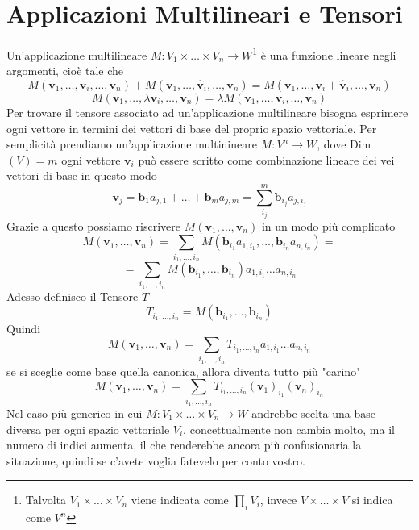 \documentclass[11pt,a4paper]{report}
\newcommand{\vettore}[1]{\mathbf{#1}}
\theoremstyle{definition}
\theoremstyle{plain}
\theoremstyle{plain}
\begin{document}
		\section{Applicazioni Multilineari e Tensori}
			Un'applicazione multilineare $M:V_1\times\dots\times V_n\rightarrow W$\footnote{Talvolta $V_1\times\dots\times V_n$ viene indicata come $\prod_i V_i$, invece $V\times\dots\times V$ si indica come $V^n$} è una funzione lineare negli argomenti, cioè tale che
			\[
				M(\vettore v_1,\dots,\vettore v_i,\dots,\vettore v_n)+M(\vettore v_1,\dots,\vettore{\hat v}_i,\dots,\vettore v_n)=
				M(\vettore v_1,\dots,\vettore v_i+\vettore{\hat v}_i,\dots,\vettore v_n)
			\]
			\begin{equation}
				M(\vettore v_1,\dots,\lambda \vettore v_i,\dots,\vettore v_n)=
				\lambda M(\vettore v_1,\dots,\vettore v_i,\dots,\vettore v_n)
			\end{equation}
			Per trovare il tensore associato ad un'applicazione multilineare bisogna esprimere ogni vettore in termini dei vettori di base del proprio spazio vettoriale.\newline
			Per semplicità prendiamo un'applicazione multinineare $M:V^n\rightarrow W$, dove Dim$(V)=m$\newline
			ogni vettore $\vettore v_i$ può essere scritto come combinazione lineare dei vei vettori di base in questo modo 
			\[
				\vettore v_j=\vettore b_1 a_{j,1}+\dots +\vettore b_m a_{j,m}=\sum_{i_j}^m\vettore b_{i_j}a_{j,i_j}
			\]
			Grazie a questo possiamo riscrivere $M(\vettore v_1,\dots,\vettore v_n)$ in un modo più complicato\newline
			\[
				M(\vettore v_1,\dots,\vettore v_n)=
				\sum_{i_1,\dots,i_n}M(\vettore b_{i_1}  a_{1,{i_1}},\dots,\vettore b_{i_n} a_{n,{i_n}})=
			\]
			\[
				=\sum_{i_1,\dots,i_n}M(\vettore b_{i_1},\dots,\vettore b_{i_n})a_{1,{i_1}}\dots a_{n,{i_n}}
			\]
			Adesso definisco il Tensore $T$
			\begin{equation}
				T_{i_1,\dots,i_n}=M(\vettore b_{i_1},\dots,\vettore b_{i_n})
			\end{equation}
			Quindi
			\begin{equation}
				M(\vettore v_1,\dots,\vettore v_n)=\sum_{i_1,\dots,i_n}T_{i_1,\dots,i_n}a_{1,{i_1}}\dots a_{n,{i_n}}
			\end{equation}
			se si sceglie come base quella canonica, allora diventa tutto più "carino"
			\[
				M(\vettore v_1,\dots,\vettore v_n)=\sum_{i_1,\dots,i_n}T_{i_1,\dots,i_n}
				(\vettore v_1)_{i_1}(\vettore v_n)_{i_n}	
			\]
			Nel caso più generico in cui $M:V_1\times\dots\times V_n\rightarrow W$ andrebbe scelta una base diversa per ogni spazio vettoriale $V_i$, concettualmente non cambia molto, ma il numero di indici aumenta, il che renderebbe ancora più confusionaria la situazione, quindi se c'avete voglia fatevelo per conto vostro.
\end{document}
